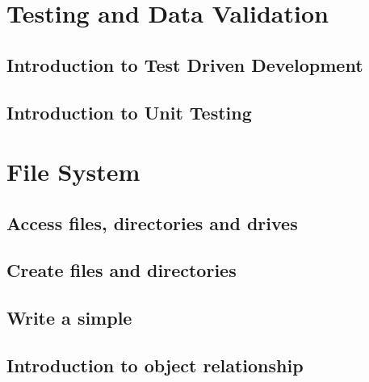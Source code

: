 \documentclass[
]{book}
\begin{document}
\hypertarget{testing-and-data-validation}{%
\chapter{Testing and Data Validation}\label{testing-and-data-validation}}

\hypertarget{introduction-to-test-driven-development}{%
\section{Introduction to Test Driven Development}\label{introduction-to-test-driven-development}}

\hypertarget{introduction-to-unit-testing}{%
\section{Introduction to Unit Testing}\label{introduction-to-unit-testing}}

\hypertarget{file-system}{%
\chapter{File System}\label{file-system}}

\hypertarget{access-files-directories-and-drives}{%
\section{Access files, directories and drives}\label{access-files-directories-and-drives}}

\hypertarget{create-files-and-directories}{%
\section{Create files and directories}\label{create-files-and-directories}}

\hypertarget{write-a-simple}{%
\section{Write a simple}\label{write-a-simple}}

\hypertarget{introduction-to-object-relationship}{%
\section{Introduction to object relationship}\label{introduction-to-object-relationship}}

  
\end{document}

